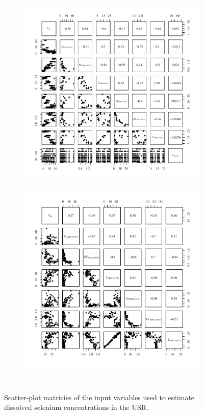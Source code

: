 \begin{linenumbers}
\begin{landscape}
\begin{figure}
\begin{subfigure}{0.7\textwidth}
			\includegraphics[width=\tableCustomSize]{"Figures/Results_USR/Stochastic/Conc Model Full PairsUDIV"}
		\end{subfigure}%
		\begin{subfigure}{0.7\textwidth}
			\centering			
			\includegraphics[width=\tableCustomSize]{"Figures/Results_USR/Stochastic/Conc Model Full PairsWTP"}
		\end{subfigure}\\
		\caption{Scatter-plot matricies of the input variables used to estimate dissolved selenium concentrations in the USR.}
	\end{figure}
\end{landscape}
\subfiguretop



\end{linenumbers}
